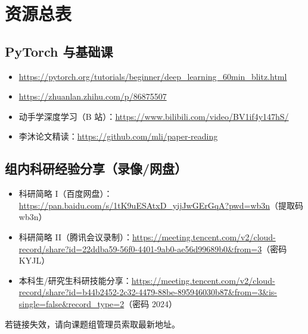 \section{资源总表}

\subsection{PyTorch 与基础课}
\begin{itemize}
  \item \url{https://pytorch.org/tutorials/beginner/deep_learning_60min_blitz.html}
  \item \url{https://zhuanlan.zhihu.com/p/86875507}
  \item 动手学深度学习（B 站）：\url{https://www.bilibili.com/video/BV1if4y147hS/}
  \item 李沐论文精读：\url{https://github.com/mli/paper-reading}
\end{itemize}

\subsection{组内科研经验分享（录像/网盘）}
\begin{itemize}
  \item 科研简略 I（百度网盘）：\url{https://pan.baidu.com/s/1tK9uESAtxD_yijJwGErGqA?pwd=wb3n}（提取码 wb3n）
  \item 科研简略 II（腾讯会议录制）：\url{https://meeting.tencent.com/v2/cloud-record/share?id=22ddba59-56f0-4401-9ab0-ae56d99689b0&from=3}（密码 KYJL）
  \item 本科生/研究生科研技能分享：\url{https://meeting.tencent.com/v2/cloud-record/share?id=b44b2452-2c32-4479-88be-895946030b87&from=3&is-single=false&record_type=2}（密码 2024）
\end{itemize}
若链接失效，请向课题组管理员索取最新地址。

